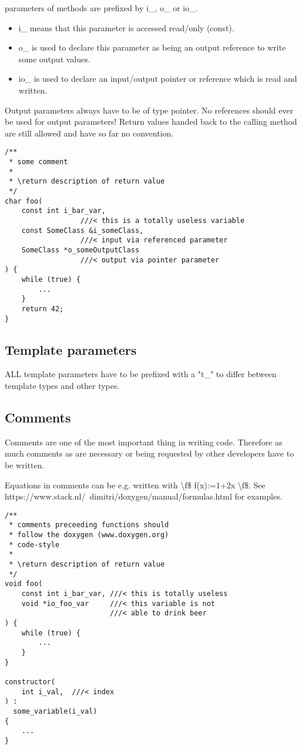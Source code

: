 \documentclass[10pt,a4paper]{article}
\begin{document}
parameters of methods are prefixed by i\_, o\_ or io\_.
\begin{itemize}
      \item i\_ means that this parameter is accessed read/only (const).
      \item o\_ is used to declare this parameter as being an output reference to write some output values.
      \item io\_ is used to declare an input/output pointer or reference which is read and written.
\end{itemize}
Output parameters always have to be of type pointer.
No references should ever be used for output parameters!
Return values handed back to the calling method are still allowed and have so far no convention.


\begin{lstlisting}
/**
 * some comment
 *
 * \return description of return value 
 */
char foo(
    const int i_bar_var,     
                  ///< this is a totally useless variable
    const SomeClass &i_someClass,    
                  ///< input via referenced parameter
    SomeClass *o_someOutputClass
                  ///< output via pointer parameter
) {
    while (true) {
        ...
    }
    return 42;
}
\end{lstlisting}

\subsection{Template parameters}
ALL template parameters have to be prefixed with a "t\_" to differ between template types and other types.


\subsection{Comments}
Comments are one of the most important thing in writing code.
Therefore as much comments as are necessary or being requested by other developers have to be written.

Equations in comments can be e.g. written with  {\textbackslash}f\$ f(x):=1+2x {\textbackslash}f\$.
See https://www.stack.nl/~dimitri/doxygen/manual/formulas.html for examples.



\begin{lstlisting}
/**
 * comments preceeding functions should
 * follow the doxygen (www.doxygen.org)
 * code-style
 *
 * \return description of return value 
 */
void foo(
    const int i_bar_var, ///< this is totally useless
    void *io_foo_var     ///< this variable is not
                         ///< able to drink beer
) {
    while (true) {
        ...
    }
}

constructor(
    int i_val,	///< index
) :
  some_variable(i_val)
{
	...
}
\end{lstlisting}
\end{document}
